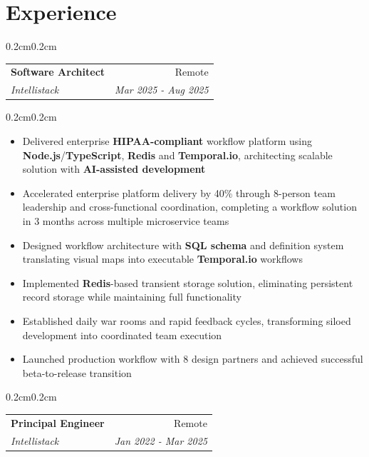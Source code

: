 \documentclass[10pt, letterpaper]{article}
\makeatletter
\newenvironment{highlights}{
    \begin{itemize}[
        topsep=0.10 cm,
        parsep=0.10 cm,
        partopsep=0pt,
        itemsep=0pt,
        leftmargin=0.4 cm + 10pt
    ]
}{
    \end{itemize}
}
\newenvironment{onecolentry}{
    \begin{adjustwidth}{0.2cm}{0.2cm}
}{
    \end{adjustwidth}
}
\newcommand{\jobentry}[4]{
    \begin{onecolentry}
        \noindent
        \begin{tabularx}{\textwidth}{@{}X r@{}}
            \textbf{#1} & #4\\
            \textit{#2} & \textit{#3}
        \end{tabularx}
        \vspace{0.05cm}
    \end{onecolentry}
}
\makeatother
\begin{document}
    \section{Experience}
    
    \jobentry{Software Architect}{Intellistack}{Mar 2025 - Aug 2025}{Remote}

    \vspace{0.10cm}
    \begin{onecolentry}
        \begin{highlights}
            \item Delivered enterprise \textbf{HIPAA-compliant} workflow platform using \textbf{Node.js}/\textbf{TypeScript}, \textbf{Redis} and \textbf{Temporal.io}, architecting scalable solution with \textbf{AI-assisted development}
            \item Accelerated enterprise platform delivery by 40\% through 8-person team leadership and cross-functional coordination, completing a workflow solution in 3 months across multiple microservice teams
            \item Designed workflow architecture with \textbf{SQL schema} and definition system translating visual maps into executable \textbf{Temporal.io} workflows
            \item Implemented \textbf{Redis}-based transient storage solution, eliminating persistent record storage while maintaining full functionality
            \item Established daily war rooms and rapid feedback cycles, transforming siloed development into coordinated team execution
            \item Launched production workflow with 8 design partners and achieved successful beta-to-release transition
        \end{highlights}
    \end{onecolentry}
    
    \vspace{0.3cm}
    \jobentry{Principal Engineer}{Intellistack}{Jan 2022 - Mar 2025}{Remote}
\end{document}

